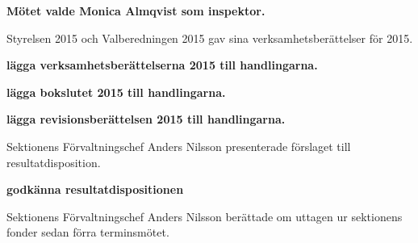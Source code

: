 \documentclass[10pt]{article}
\begin{document}
	\begin{paragrafer} \item[] %
	\begin{paragrafer}

    \textbf{Mötet valde Monica Almqvist som inspektor.}

\end{paragrafer}
Styrelsen 2015 och Valberedningen 2015 gav sina verksamhetsberättelser för 2015.

\textbf{\Mba lägga verksamhetsberättelserna 2015 till handlingarna.}

\textbf{\Mba lägga bokslutet 2015 till handlingarna.}

\textbf{\Mba lägga revisionsberättelsen 2015 till handlingarna.}

Sektionens Förvaltningschef Anders Nilsson presenterade förslaget till resultatdisposition.

\textbf{\Mba godkänna resultatdispositionen}

Sektionens Förvaltningschef Anders Nilsson berättade om uttagen ur sektionens fonder sedan förra terminsmötet.


\end{paragrafer}
\end{document}
